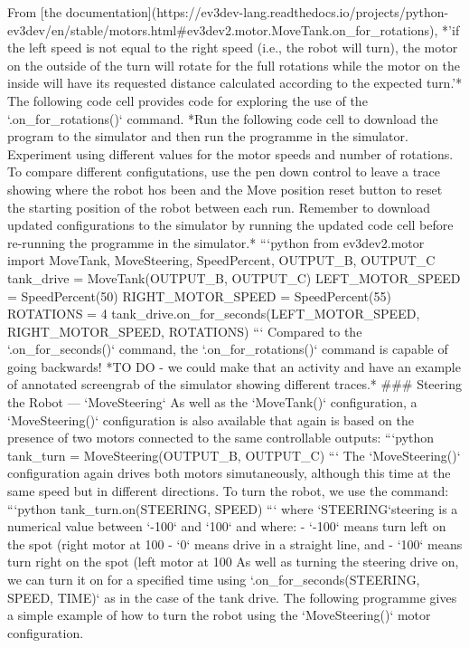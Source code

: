\documentclass[letterpaper,10pt,english]{sphinxmanual}
\begin{document}
{From [the documentation](https://ev3dev-lang.readthedocs.io/projects/python-ev3dev/en/stable/motors.html#ev3dev2.motor.MoveTank.on_for_rotations), *'if the left speed is not equal to the right speed (i.e., the robot will turn), the motor on the outside of the turn will rotate for the full rotations while the motor on the inside will have its requested distance calculated according to the expected turn.'*
The following code cell provides code for exploring the use of the `.on_for_rotations()` command.
*Run the following code cell to download the program to the simulator and then run the programme in the simulator. Experiment using different values for the motor speeds and number of rotations. To compare different configutations, use the pen down control to leave a trace showing where the robot hos been and the Move position reset button to reset the starting position of the robot between each run. Remember to download updated configurations to the simulator by running the updated code cell before re-running the programme in the simulator.*
```python
from ev3dev2.motor import MoveTank, MoveSteering, SpeedPercent, OUTPUT_B, OUTPUT_C
tank_drive = MoveTank(OUTPUT_B, OUTPUT_C)
LEFT_MOTOR_SPEED = SpeedPercent(50)
RIGHT_MOTOR_SPEED = SpeedPercent(55)
ROTATIONS = 4
tank_drive.on_for_seconds(LEFT_MOTOR_SPEED, RIGHT_MOTOR_SPEED, ROTATIONS)
```
Compared to the `.on_for_seconds()` command, the `.on_for_rotations()` command is capable of going backwards!
*TO DO - we could make that an activity and have an example of annotated screengrab of the simulator showing different traces.*
### Steering the Robot — `MoveSteering`
As well as the `MoveTank()` configuration, a `MoveSteering()` configuration is also available that again is based on the presence of two motors connected to the same controllable outputs:
```python
tank_turn = MoveSteering(OUTPUT_B, OUTPUT_C)
```
The `MoveSteering()` configuration again drives both motors simutaneously, although this time at the same speed but in different directions.
To turn the robot, we use the command:
```python
tank_turn.on(STEERING, SPEED)
```
where `STEERING`steering is a numerical value between `-100` and `100` and where:
- `-100` means turn left on the spot (right motor at 100%
- `0` means drive in a straight line, and
- `100` means turn right on the spot (left motor at 100%
As well as turning the steering drive on, we can turn it on for a specified time using `.on_for_seconds(STEERING, SPEED, TIME)` as in the case of the tank drive.
The following programme gives a simple example of how to turn the robot using the `MoveSteering()` motor configuration.
}
\end{document}
